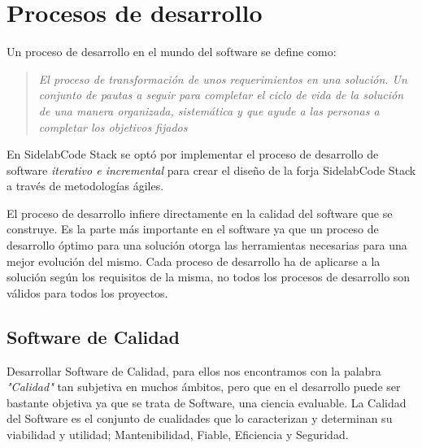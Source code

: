 %
% 

\chapter{Procesos de desarrollo}
\label{chap:procesos-desarrollo}

\par Un proceso de desarrollo en el mundo del software se define como:

\begin{quote}
\emph{El proceso de transformación de unos requerimientos en una solución. Un conjunto de pautas a seguir para completar el ciclo de vida de la solución de una manera organizada, sistemática y que ayude a las personas a completar los objetivos fijados}
\end{quote}

\par En SidelabCode Stack se optó por implementar el proceso de desarrollo de software \emph{iterativo e incremental} para crear el dise\~no de la forja SidelabCode Stack a través de metodolog\'ias ágiles.

\par El proceso de desarrollo infiere directamente en la calidad del software que se construye. Es la parte más importante en el software ya que un proceso de desarrollo óptimo para una solución otorga las herramientas necesarias para una mejor evolución del mismo. Cada proceso de desarrollo ha de aplicarse a la solución según los requisitos de la misma, no todos los procesos de desarrollo son válidos para todos los proyectos.

\section{Software de Calidad}
\label{sec:software-calidad}

\par Desarrollar Software de Calidad, para ellos nos encontramos con la palabra \emph{"Calidad"} tan subjetiva en muchos ámbitos, pero que en el desarrollo puede ser bastante objetiva ya que se trata de Software, una ciencia evaluable. La Calidad del Software es el conjunto de cualidades que lo caracterizan y determinan su viabilidad y utilidad; Mantenibilidad, Fiable, Eficiencia y Seguridad.


